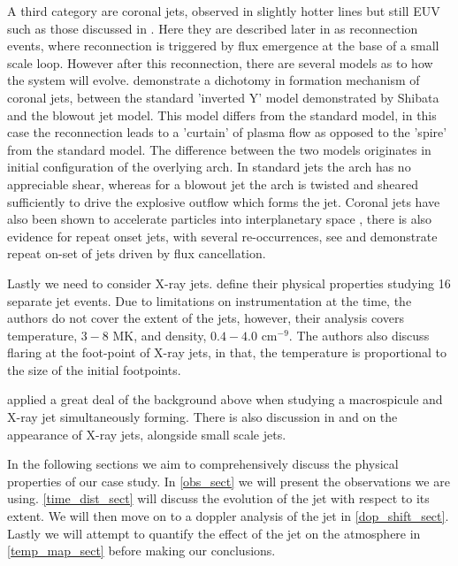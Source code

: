 \documentclass{emulateapj}
\begin{document}
A third  category are coronal jets, observed in slightly hotter lines but still EUV such as those discussed in \cite{Shibata1992}.
Here they are described later in \cite{Shibata1994} as reconnection events, where reconnection is triggered by flux emergence at the base of a small scale loop.
However after this reconnection, there are several models as to how the system will evolve.
\cite{Moore2010} demonstrate a dichotomy in formation mechanism of coronal jets, between the standard 'inverted Y' model demonstrated by Shibata and the blowout jet model. 
This model differs from the standard model, in this case the reconnection leads to a 'curtain' of plasma flow as opposed to the 'spire' from the standard model.
The difference between the two models originates in initial configuration of the overlying arch. 
In standard jets the arch has no appreciable shear, whereas for a blowout jet the arch is twisted and sheared sufficiently to drive the explosive outflow which forms the jet.
Coronal jets have also been shown to accelerate particles into interplanetary space \citep{Li2011}, there is also evidence for repeat onset jets, with several re-occurrences, see \cite{Li2011} and \cite{Chifor2008} demonstrate repeat on-set of jets driven by flux cancellation.

Lastly we need to consider X-ray jets.
\cite{Shimojo2000} define their physical properties studying 16 separate jet events.
Due to limitations on instrumentation at the time, the authors do not cover the extent of the jets, however, their analysis covers temperature, $3 - 8$ MK, and density, $0.4 - 4.0$ cm$^{-9}$.
The authors also discuss flaring at the foot-point of X-ray jets, in that, the temperature is proportional to the size of the initial footpoints.

\cite{Kamio2010} applied a great deal of the background above when studying a macrospicule and X-ray jet simultaneously forming. There is also discussion in \cite{Pike_Harrison1997} and \cite{Kim2007} on the appearance of X-ray jets, alongside small scale jets.

In the following sections we aim to comprehensively discuss the physical properties of our case study. In \ref{obs_sect} we will present the observations we are using. \ref{time_dist_sect} will discuss the evolution of the jet with respect to its extent. We will then move on to a doppler analysis of the jet in \ref{dop_shift_sect}. Lastly we will attempt to quantify the effect of the jet on the atmosphere in \ref{temp_map_sect} before making our conclusions.
\end{document}
